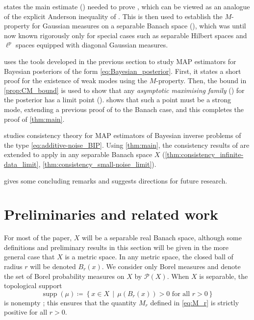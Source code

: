 \documentclass[11pt]{article}
\newcommand*{\cball}[2]{B_{#2}(#1)}
\newcommand*{\defeq}{\coloneqq}
\newcommand*{\defterm}{\emph}%
\newcommand*{\prob}[1]{\mathscr{P}(#1)}
\DeclareMathOperator*{\supp}{supp}
\newcommand*{\crcdf}[2]{\mu(\cball{#1}{#2})}
\theoremstyle{plain}
\theoremstyle{definition}
\newcommand{\Set}[2]{\left\{ #1 \,\middle\vert\, #2 \right\}}
\numberwithin{equation}{section}
\numberwithin{figure}{section}
\numberwithin{table}{section}
\begin{document}
 states the main estimate () needed to prove , which can be viewed as an analogue of the explicit Anderson inequality of \citet[Lemma~3.6]{DashtiLawStuartVoss2013}.
This is then used to establish the $M$-property for Gaussian measures on a separable Banach space (), which was until now known rigorously only for special cases such as separable Hilbert spaces and $\ell^{p}$ spaces equipped with diagonal Gaussian measures.

 uses the tools developed in the previous section to study MAP estimators for Bayesian posteriors of the form \eqref{eq:Bayesian_posterior}.
First, it states a short proof for the existence of weak modes using the $M$-property.
Then, the bound in \cref{prop:CM_bound} is used to show that any \defterm{asymptotic maximising family} () for the posterior has a limit point ().
 shows that such a point must be a strong mode, extending a previous proof of \citet{KlebanovWacker2022} to the Banach case, and this completes the proof of \cref{thm:main}.

 studies consistency theory for MAP estimators of Bayesian inverse problems of the type \eqref{eq:additive-noise_BIP}.
Using \cref{thm:main}, the consistency results of \citet{DashtiLawStuartVoss2013} are extended to apply in any separable Banach space $X$ (\cref{thm:consistency_infinite-data_limit}, \cref{thm:consistency_small-noise_limit}).

 gives some concluding remarks and suggests directions for future research.

\section{Preliminaries and related work}
\label{sec:notation}

For most of the paper, $X$ will be a separable real Banach space, although some definitions and preliminary results in this section will be given in the more general case that $X$ is a metric space.
In any metric space, the closed ball of radius $r$ will be denoted $\cball{x}{r}$.
We consider only Borel measures and denote the set of Borel probability measures on $X$ by $\prob{X}$.
When $X$ is separable, the topological support
\begin{equation*}
	\supp(\mu) \defeq \Set{x \in X}{\crcdf{x}{r} > 0 \text{ for all } r > 0}
\end{equation*}
is nonempty \citep{AliprantisBorder2006};
this ensures that the quantity $M_{r}$ defined in \eqref{eq:M_r} is strictly positive for all $r > 0$.
\end{document}
